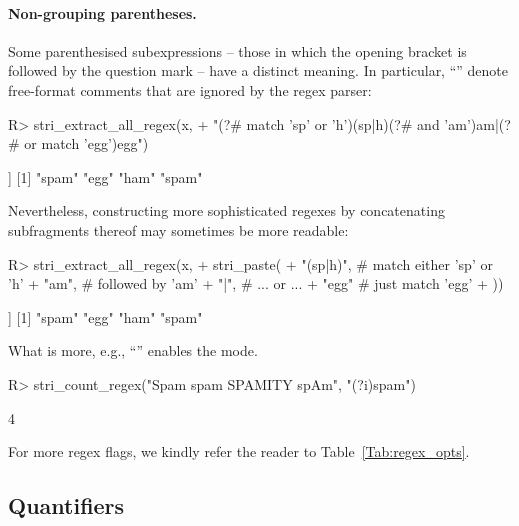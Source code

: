 \documentclass[nojss]{jss}\usepackage[]{graphicx}\usepackage[]{color}
\newcommand{\str}[1]{\code{{#1}}}
\begin{document}
\paragraph{Non-grouping parentheses.}
Some parenthesised subexpressions -- those in which the opening bracket is followed by the question mark -- have a distinct meaning.
In particular, ``\str{(?\#...)}'' denote free-format comments
that are ignored by the regex parser:

\begin{Schunk}
\begin{Sinput}
R> stri_extract_all_regex(x,
+    "(?# match 'sp' or 'h')(sp|h)(?# and 'am')am|(?# or match 'egg')egg")
\end{Sinput}
\begin{Soutput}
[[1]]
[1] "spam" "egg"  "ham"  "spam"
\end{Soutput}
\end{Schunk}

\noindent
Nevertheless, constructing more sophisticated regexes by concatenating
subfragments thereof may sometimes be more readable:

\begin{Schunk}
\begin{Sinput}
R> stri_extract_all_regex(x,
+    stri_paste(
+        "(sp|h)",   # match either 'sp' or 'h'
+        "am",       # followed by 'am'
+      "|",            # ... or ...
+        "egg"       # just match 'egg'
+  ))
\end{Sinput}
\begin{Soutput}
[[1]]
[1] "spam" "egg"  "ham"  "spam"
\end{Soutput}
\end{Schunk}


What is more, e.g., ``\str{(?i)}'' enables the 
mode.

\begin{Schunk}
\begin{Sinput}
R> stri_count_regex("Spam spam SPAMITY spAm", "(?i)spam")
\end{Sinput}
\begin{Soutput}
[1] 4
\end{Soutput}
\end{Schunk}

For more regex flags, we kindly refer the reader to Table~\ref{Tab:regex_opts}.




\subsection{Quantifiers}
\end{document}
